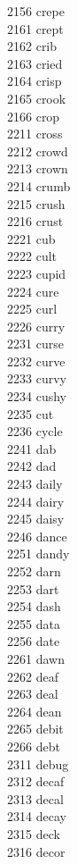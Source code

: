2156 crepe \\
2161 crept \\
2162 crib \\
2163 cried \\
2164 crisp \\
2165 crook \\
2166 crop \\
2211 cross \\
2212 crowd \\
2213 crown \\
2214 crumb \\
2215 crush \\
2216 crust \\
2221 cub \\
2222 cult \\
2223 cupid \\
2224 cure \\
2225 curl \\
2226 curry \\
2231 curse \\
2232 curve \\
2233 curvy \\
2234 cushy \\
2235 cut \\
2236 cycle \\
2241 dab \\
2242 dad \\
2243 daily \\
2244 dairy \\
2245 daisy \\
2246 dance \\
2251 dandy \\
2252 darn \\
2253 dart \\
2254 dash \\
2255 data \\
2256 date \\
2261 dawn \\
2262 deaf \\
2263 deal \\
2264 dean \\
2265 debit \\
2266 debt \\
2311 debug \\
2312 decaf \\
2313 decal \\
2314 decay \\
2315 deck \\
2316 decor \\
